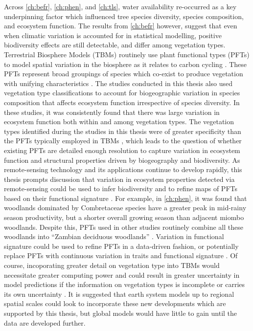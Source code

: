 \begin{refsection}
Across \autoref{ch:befr}, \autoref{ch:phen}, and \autoref{ch:tls}, water availability re-occurred as a key underpinning factor which influenced tree species diversity, species composition, and ecosystem function. The results from \autoref{ch:befr} however, suggest that even when climatic variation is accounted for in statistical modelling, positive biodiversity effects are still detectable, and differ among vegetation types. Terrestrial Biosphere Models (TBMs) routinely use plant functional types (PFTs) to model spatial variation in the biosphere as it relates to carbon cycling \citep{}. These PFTs represent broad groupings of species which co-exist to produce vegetation with unifying characteristics \citep{Wullschleger2014}. The studies conducted in this thesis also used vegetation type classifications to account for biogeographic variation in species composition that affects ecosystem function irrespective of species diversity. In these studies, it was consistently found that there was large variation in ecosystem function both within and among vegetation types. The vegetation types identified during the studies in this thesis were of greater specificity than the PFTs typically employed in TBMs \citep{}, which leads to the question of whether existing PFTs are detailed enough resolution to capture variation in ecosystem function and structural properties driven by biogeography and biodiversity. As remote-sensing technology and its applications continue to develop rapidly, this thesis prompts discussion that variation in ecosystem properties detected via remote-sensing could be used to infer biodiversity and to refine maps of PFTs based on their functional signature \citep{}. For example, in \autoref{ch:phen}, it was found that woodlands dominated by Combretaceae species have a greater peak in mid-rainy season productivity, but a shorter overall growing season than adjacent miombo woodlands. Despite this, PFTs used in other studies routinely combine all these woodlands into ``Zambian deciduous woodlands'' \citep{}. Variation in functional signature could be used to refine PFTs in a data-driven fashion, or potentially replace PFTs with continuous variation in traits and functional signature \citep{}. Of course, incoporating greater detail on vegetation type into TBMs would necessitate greater computing power and could result in greater uncertainty in model predictions if the information on vegetation types is incomplete or carries its own uncertainty \citep{}. It is suggested that earth system models up to regional spatial scales could look to incorporate these new developments which are supported by this thesis, but global models would have little to gain until the data are developed further.


\end{refsection}

